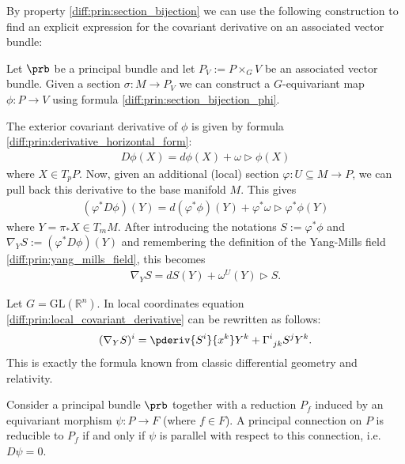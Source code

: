     By property \ref{diff:prin:section_bijection} we can use the following construction to find an explicit expression for the covariant derivative on an associated vector bundle:
    \begin{construct}
        Let $\prb$ be a principal bundle and let $P_V := P\times_G V$ be an associated vector bundle. Given a section $\sigma:M\rightarrow P_V$ we can construct a $G$-equivariant map $\phi:P\rightarrow V$ using formula \ref{diff:prin:section_bijection_phi}.

        The exterior covariant derivative of $\phi$ is given by formula \ref{diff:prin:derivative_horizontal_form}:
        \begin{gather}
            D\phi(X) = d\phi(X) + \omega\triangleright\phi(X)
        \end{gather}
        where $X\in T_pP$. Now, given an additional (local) section $\varphi:U\subseteq M\rightarrow P$, we can pull back this derivative to the base manifold $M$. This gives
        \begin{gather}
            (\varphi^*D\phi)(Y) = d(\varphi^*\phi)(Y) + \varphi^*\omega\triangleright\varphi^*\phi(Y)
        \end{gather}
        where $Y=\pi_*X\in T_mM$. After introducing the notations $S:=\varphi^*\phi$ and $\nabla_YS:=(\varphi^*D\phi)(Y)$ and remembering the definition of the Yang-Mills field \ref{diff:prin:yang_mills_field}, this becomes
        \begin{gather}
            \label{diff:prin:local_covariant_derivative}
            \nabla_YS = dS(Y) + \omega^U(Y)\triangleright S.
        \end{gather}
    \end{construct}
    \begin{example}
        Let $G=\text{GL}(\mathbb{R}^n)$. In local coordinates equation \ref{diff:prin:local_covariant_derivative} can be rewritten as follows:
        \begin{gather}
            (\nabla_YS)^i = \pderiv{S^i}{x^k}Y^k + \Gamma^i_{\ jk}S^jY^k.
        \end{gather}
        This is exactly the formula known from classic differential geometry and relativity.
    \end{example}

    \begin{property}\label{diff:prin:connection_reducibility}
        Consider a principal bundle $\prb$ together with a reduction $P_f$ induced by an equivariant morphism $\psi:P\rightarrow F$ (where $f\in F$). A principal connection on $P$ is reducible to $P_f$ if and only if $\psi$ is parallel with respect to this connection, i.e. $D\psi = 0$.
    \end{property}


